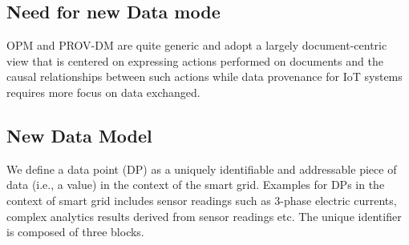 \subsection{Need for new Data mode}
OPM and PROV-DM are quite generic and adopt a largely document-centric view that is centered on expressing actions performed on documents and the causal relationships between such actions while data provenance for IoT systems requires more focus on data exchanged.

\subsection{New Data Model}

We define a data point (DP) as a uniquely identifiable and addressable piece of data (i.e., a value) in the context of the smart grid. Examples for DPs in the context of smart grid includes sensor readings such as 3-phase electric currents, complex analytics results derived from sensor readings etc. The unique identifier is composed of three blocks.
